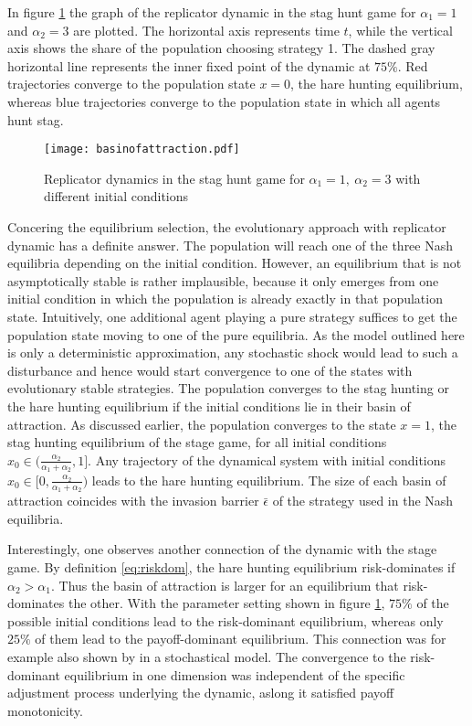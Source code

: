 In figure \ref{fig:basinofattraction} the graph of the replicator dynamic
in the stag hunt game for $\alpha_1=1$ and $\alpha_2=3$ are plotted. The
horizontal axis represents time $t$, while the vertical axis shows
the share of the population choosing strategy 1. The dashed gray horizontal
line represents the inner fixed point of the dynamic at $75\%$.
Red trajectories converge to the population state $x=0$, the hare hunting
equilibrium, whereas blue trajectories converge to the population state in 
which all agents hunt stag.
\begin{figure}
 \centering
        \texttt{[image: basinofattraction.pdf]}
        \caption[Replicator dynamic of the stag hunt game]{Replicator dynamics in the stag hunt game for 
                $\alpha_1=1,\ \alpha_2=3$ with different initial conditions}
                \label{fig:basinofattraction}
\end{figure}

Concering the equilibrium selection, the evolutionary approach with replicator
dynamic has a definite answer. The population will reach one of the three
Nash equilibria depending on the initial condition. 
However, an equilibrium that is not asymptotically stable 
is rather implausible,
because it only emerges from one initial condition in which the population
is already exactly in that population state. 
Intuitively, one additional agent playing
a pure strategy suffices to get the population state moving to one of the
pure equilibria. As the model outlined here is only a deterministic
approximation, any stochastic shock would lead to such a disturbance and hence
would start convergence to one of the states with evolutionary stable 
strategies.
The population converges to the stag hunting or the hare
hunting equilibrium if the initial conditions lie in their 
basin of attraction.
As discussed earlier, the population converges to the state $x=1$, 
the stag hunting equilibrium of the stage game, for all initial conditions 
$x_0 \in (\frac{\alpha_2}{\alpha_1+\alpha_2},1]$. Any trajectory of the 
dynamical system with initial conditions 
$x_0 \in [0,\frac{\alpha_2}{\alpha_1+\alpha_2})$ leads to the hare hunting
equilibrium. The size of each basin of attraction coincides with the invasion 
barrier $\bar{\epsilon}$ of the strategy used in the Nash equilibria.

Interestingly, one observes another connection of the 
dynamic with the stage game. 
By definition \eqref{eq:riskdom}, 
the hare hunting equilibrium risk-dominates if $\alpha_2 > \alpha_1$.
Thus the basin of attraction is larger for an equilibrium that 
risk-dominates the other. With the parameter setting shown
in figure \ref{fig:basinofattraction}, $75\%$ of the possible initial 
conditions lead to the risk-dominant equilibrium, whereas only $25\%$ of 
them lead to the payoff-dominant equilibrium. This 
connection was for example also shown by \textcite{kandori_learning_1993} 
in a stochastical model. The convergence to the risk-dominant equilibrium
in one dimension was independent of the specific adjustment process 
underlying the dynamic, aslong it satisfied payoff monotonicity.


